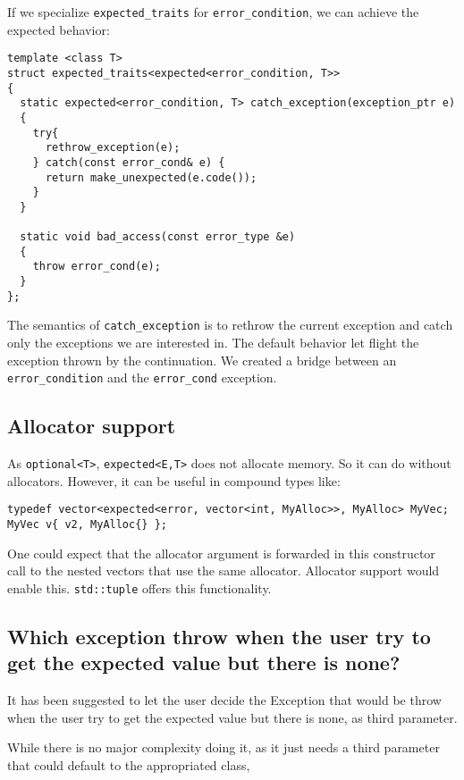 \documentclass[a4paper,10pt]{article}
\newcommand{\cpp}[1]{\lstinline{#1}}
\begin{document}
\noindent
If we specialize \cpp{expected_traits} for \cpp{error_condition}, we can achieve the expected behavior:

\begin{lstlisting}
template <class T>
struct expected_traits<expected<error_condition, T>>
{
  static expected<error_condition, T> catch_exception(exception_ptr e)
  {
    try{
      rethrow_exception(e);
    } catch(const error_cond& e) {
      return make_unexpected(e.code());
    }
  }

  static void bad_access(const error_type &e)
  {
    throw error_cond(e);
  }
};
\end{lstlisting}

The semantics of \cpp{catch_exception} is to rethrow the current exception and catch only the exceptions we are interested in. The default behavior let flight the exception thrown by the continuation. We created a bridge between an \cpp{error_condition} and the \cpp{error_cond} exception.

\subsection{Allocator support}

As \cpp{optional<T>},  \cpp{expected<E,T>} does not allocate memory. So it can do without allocators. However, it can be useful in compound types like:

\begin{lstlisting}
typedef vector<expected<error, vector<int, MyAlloc>>, MyAlloc> MyVec;
MyVec v{ v2, MyAlloc{} };
\end{lstlisting}

\noindent
One could expect that the allocator argument is forwarded in this constructor call to the nested vectors that use the same allocator. Allocator support would enable this. \cpp{std::tuple} offers this functionality.

\subsection{Which exception throw when the user try to get the expected value but there is none?}

It has been suggested to let the user decide the Exception that would be throw when the user try to get the expected value but there is none, as third parameter. 

While there is no major complexity doing it, as it just needs a third parameter that could default to the appropriated class, 
\end{document}
